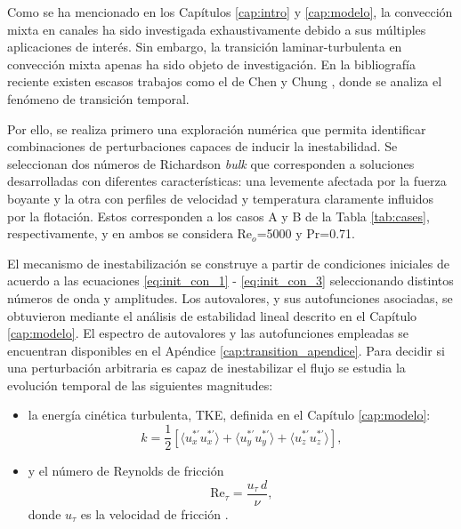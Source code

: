 Como se ha mencionado en los Capítulos \ref{cap:intro} y \ref{cap:modelo}, la convección mixta en canales ha sido investigada exhaustivamente debido a sus múltiples aplicaciones de interés. Sin embargo, la transición laminar-turbulenta en convección mixta apenas ha sido objeto de investigación. En la bibliografía reciente existen escasos trabajos como el de Chen y Chung \cite{chen2003direct}, donde se analiza el fenómeno de transición temporal.

Por ello, se realiza primero una exploración numérica que permita identificar combinaciones de perturbaciones capaces de inducir la inestabilidad. Se seleccionan dos números de Richardson \textit{bulk} que corresponden a soluciones desarrolladas con diferentes características: una levemente afectada por la fuerza boyante y la otra con perfiles de velocidad y temperatura claramente influidos por la flotación. Estos corresponden a los casos A y B de la Tabla \ref{tab:cases}, respectivamente, y en ambos se considera Re$_o$=5000 y Pr=0.71.

El mecanismo de inestabilización se construye a partir de condiciones iniciales de acuerdo a las ecuaciones \ref{eq:init_con_1} - \ref{eq:init_con_3} seleccionando distintos números de onda y amplitudes. Los autovalores, y sus autofunciones asociadas, se obtuvieron mediante el análisis de estabilidad lineal descrito en el Capítulo \ref{cap:modelo}. El espectro de autovalores y las autofunciones empleadas se encuentran disponibles en el Apéndice \ref{cap:transition_apendice}. Para decidir si una perturbación arbitraria es capaz de inestabilizar el flujo se estudia la evolución temporal de las siguientes magnitudes:

\begin{itemize}
  \item la energía cinética turbulenta, TKE, definida en el Capítulo \ref{cap:modelo}: 
  	\begin{equation*}
  		k = \frac{1}{2} \left[ \langle u^{* \prime}_x u^{* \prime}_x \rangle + \langle u^{* \prime}_y u^{* \prime}_y \rangle + \langle u^{* \prime}_z u^{* \prime}_z \rangle \right], 
  	\end{equation*}

  \item y el número de Reynolds de fricción
        \[
          \text{Re}_{\tau} = \frac{u_{\tau}\,d}{\nu},
        \]
        donde \(u_{\tau}\) es la velocidad de fricción \cite{pope2001turbulent}.
\end{itemize}

\begin{table}[H]
\centering
{}
\caption{Parámetros adimensionales de los dos casos elegidos.}
\label{tab:cases}
\end{table}


